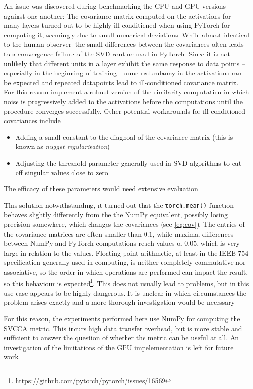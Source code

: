An issue was discovered during benchmarking the CPU and GPU versions against one
another: The covariance matrix computed on the activations for many layers
turned out to be highly ill-conditioned when using PyTorch for computing it,
seemingly due to small numerical deviations. While almost identical to the human
observer, the small differences between the covariances often leads to a
convergence failure of the SVD routine used in PyTorch. Since it is not unlikely
that different units in a layer exhibit the same response to data points --
especially in the beginning of training---some redundancy in the activations
can be expected and repeated datapoints lead to ill-conditioned covariance
matrix. For this reason \citeauthor{raghu2017svcca} implement a robust version
of the similarity computation in which noise is progressively added to the
activations before the computations until the procedure converges successfully.
Other potential workarounds for ill-conditioned covariances include
\begin{itemize}
    \item Adding a small constant to the diagnoal of the covariance matrix (this
        is known as \emph{nugget regularisation})
    \item Adjusting the threshold parameter generally used in SVD algorithms to
        cut off singular values close to zero
\end{itemize}
The efficacy of these parameters would need extensive evaluation.

This solution notwithstanding, it turned out
that the \texttt{torch.mean()} function behaves slightly differently from the
the NumPy equivalent, possibly losing precision somewhere, which changes the
covariances (see \cref{eq:cov}).  The entries of the covariance matrices are
often smaller than $0.1$, while maximal differences between NumPy and PyTorch
computations reach values of $0.05$, which is very large in relation to the
values.
Floating point arithmetic, at least in the IEEE 754 specification generally used
in computing, is neither completely commutative nor associative, so the order in
which operations are performed can impact the result, so this behaviour is
expected\footnote{\url{https://github.com/pytorch/pytorch/issues/16569}}. This
does not usually lead to problems, but in this use case appears to be highly
dangerous. It is unclear in which circumstances the problem arises exactly and a
more thorough investigation would be necessary.

For this reason, the experiments
performed here use NumPy for computing the SVCCA metric. This incurs high data
transfer overhead, but is more stable and sufficient to answer the question of whether the
metric can be useful at all. An investigation of the limitations of the GPU
impelementation is left for future work.


